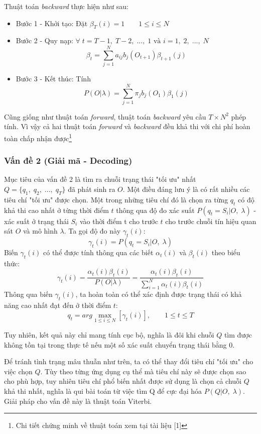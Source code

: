 Thuật toán \textit{backward} thực hiện như sau:
\begin{itemize}
	\item Bước 1 - Khởi tạo: Đặt $\beta_T(i) = 1 \qquad 1 \leq i \leq N$
	\item Bước 2 - Quy nạp: $\forall \; t=T-1,\; T-2,\; ...,\; 1 \text{ và } i=1,\; 2,\; ...,\;N$
	$$\beta_t = \sum_{j=1}^{N} a_{ij}b_j (O_{t+1})\beta_{t+1}(j)$$
	\item Bước 3 - Kết thúc: Tính $$P(O|\lambda)=\sum_{j=1}^{N}\pi_j b_j(O_1)\beta_1(j)$$
\end{itemize}

Cũng giống như thuật toán \textit{forward}, thuật toán \textit{backward} yêu cầu $T\times N^2$ phép tính. Vì vậy cả hai thuật toán \textit{forward} và \textit{backward} đều khả thi với chi phí hoàn toàn chấp nhận được\footnote{Chi tiết chứng minh về thuật toán xem tại tài liệu [1]}

\subsubsection{Vấn đề 2 (Giải mã - Decoding)}
Mục tiêu của vấn đề 2 là tìm ra chuỗi trạng thái "tối ưu" nhất $Q=\{q_1,\;q_2,\;...,\;q_T\}$ đã phát sinh ra $O$. Một điều đáng lưu ý là có rất nhiều các tiêu chí "tối ưu" được chọn. Một trong những tiêu chí đó là chọn ra từng $q_t$ có độ khả thi cao nhất ở từng thời điểm $t$ thông qua độ đo xác suất $P(q_t=S_i|O,\; \lambda)$ - xác suất ở trạng thái $S_i$ vào thời điểm t cho trước $t$ cho trước chuỗi tín hiệu quan sát $O$ và mô hình $\lambda$. Ta gọi độ đo này $\gamma_t(i)$:
$$\gamma_t(i)=P(q_t=S_i|O,\; \lambda)$$ 
Biến $\gamma_t(i)$ có thể được tính thông qua các biết $\alpha_t(i)$ và $\beta_t(i)$ theo biểu thức:
$$\gamma_t(i) = \frac{\alpha_t(i)\beta_t(i)}{P(O|\lambda)}=\frac{\alpha_t(i)\beta_t(i)}{\sum_{i=1}^{N}\alpha_t(i)\beta_t(i)}$$
Thông qua biến $\gamma_t(i)$, ta hoàn toàn có thể xác định được trạng thái có khả năng cao nhất đạt đến ở thời điểm $t$:
$$q_t=arg
\max_{1\leq i\leq N}[\gamma_t(i)], \qquad 1 \leq t \leq T$$

Tuy nhiên, kết quả này chỉ mang tính cục bộ, nghĩa là đôi khi chuỗi $Q$ tìm được không tồn tại trong thực tế nếu một số xác suất chuyển trạng thái bằng 0. 

Để tránh tình trạng mâu thuẫn như trên, ta có thể thay đổi tiêu chí "tối ưu" cho việc chọn $Q$. Tùy theo từng ứng dụng cụ thể mà tiêu chí này sẽ được chọn sao cho phù hợp, tuy nhiên tiêu chí phổ biến nhất được sử dụng là chọn cả chuỗi $Q$ khả thi nhất, nghĩa là qui bài toán từ việc tìm Q để cực đại hóa $P(Q|O,\;\lambda)$. Giải pháp cho vấn đề này là thuật toán Viterbi.

